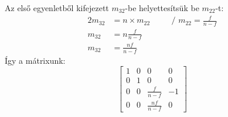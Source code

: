 \documentclass[12pt]{report}
\begin{document}
Az első egyenletből kifejezett $m_{32}$-be helyettesítsük be $m_{22}$-t:
\begin{alignat*}{2}
    m_{32} & = n \times m_{22} & \quad & \text{/ } m_{22}=\frac{f}{n-f} \\
    m_{32} & = n \frac{f}{n-f} & \quad &                                \\
    m_{32} & = \frac{nf}{n-f}
\end{alignat*}
Így a mátrixunk:
\[
    \begin{bmatrix}
        1 & 0 & 0              & 0  \\
        0 & 1 & 0              & 0  \\
        0 & 0 & \frac{f}{n-f}  & -1 \\
        0 & 0 & \frac{nf}{n-f} & 0
    \end{bmatrix}
\]
\end{document}
